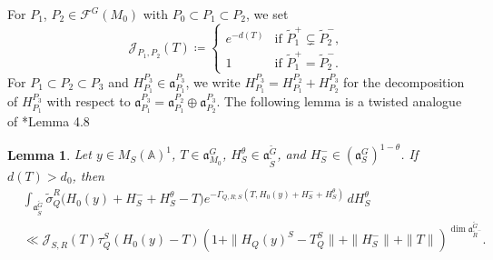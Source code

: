 \documentclass[12pt]{amsart}
\theoremstyle{definition}
\theoremstyle{plain}
\newtheorem{lemma}[definition]{Lemma}
\theoremstyle{remark}
\def\A{\mathbb{A}}%
\newcommand{\fa}{\mathfrak{a}}
\newcommand{\cF}{\mathcal{F}}
\newcommand{\cJ}{\mathcal{J}}
\numberwithin{equation}{section}
\newcommand{\tG}{\widetilde{G}}
\newcommand{\tP}{\widetilde{P}}
\newcommand{\tR}{\widetilde{R}}
\newcommand{\tS}{\widetilde{S}}
\begin{document}
For $P_1$, $P_2\in\cF^G(M_0)$ with $P_0\subset P_1\subset P_2$, 
we set
\[
\cJ_{P_1,P_2}(T)\coloneqq\begin{cases}
    e^{-d(T)} & \text{if $\tP_1^+\subsetneq\tP_2^-$,}\\
    1 & \text{if $\tP_1^+=\tP_2^-$.}
\end{cases}
\]
For $P_1\subset P_2\subset P_3$ and $H_{P_1}^{P_3}\in \fa_{P_1}^{P_3}$, we write $H_{P_1}^{P_3}=H_{P_1}^{P_2}+H_{P_2}^{P_3}$ for the decomposition of $H_{P_1}^{P_3}$ with respect to $\fa_{P_1}^{P_3}=\fa_{P_1}^{P_2}\oplus\fa_{P_2}^{P_3}$.
The following lemma is a twisted analogue of \cite{FL16}*{Lemma 4.8}
\begin{lemma}\label{lem:analogueFL48}
Let $y\in M_S(\A)^1$, $T\in\fa_{M_0}^G$, $H_S^\theta\in\fa_{\tS}^{\tG}$, and $H_S^-\in(\fa_S^G)^{1-\theta}$.
If $d(T)>d_0$, then
\begin{align*}
&\int_{\fa_{\tS}^{\tG}}
 \widetilde\sigma_Q^R\bigl(H_0(y)+H^-_S+H^\theta_S-T\bigr)
 e^{-\Gamma_{Q,R;S}(T,H_0(y)+H^-_S+H^\theta_S)}\,dH^\theta_S\\
&\ll
\cJ_{S,R}(T)
\tau_Q^S(H_0(y)-T)
\left(1+\|H_Q(y)^S-T_Q^S\|+
 \|H^-_S\| +\|T\| \right)^{\dim\fa_{\tR^-}^{\tG}}.
\end{align*}
\end{lemma}
\end{document}
